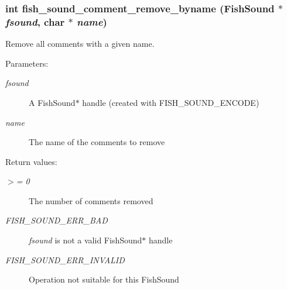 \subsubsection{\setlength{\rightskip}{0pt plus 5cm}int fish\_\-sound\_\-comment\_\-remove\_\-byname ({\bf Fish\-Sound} $\ast$ {\em fsound}, char $\ast$ {\em name})}\label{comments_8h_a8}


Remove all comments with a given name. 

\begin{Desc}
\item[Parameters:]
\begin{description}
\item[{\em fsound}]A Fish\-Sound$\ast$ handle (created with FISH\_\-SOUND\_\-ENCODE) \item[{\em name}]The name of the comments to remove \end{description}
\end{Desc}
\begin{Desc}
\item[Return values:]
\begin{description}
\item[{\em $>$= 0}]The number of comments removed \item[{\em FISH\_\-SOUND\_\-ERR\_\-BAD}]{\em fsound\/} is not a valid Fish\-Sound$\ast$ handle \item[{\em FISH\_\-SOUND\_\-ERR\_\-INVALID}]Operation not suitable for this Fish\-Sound \end{description}
\end{Desc}
